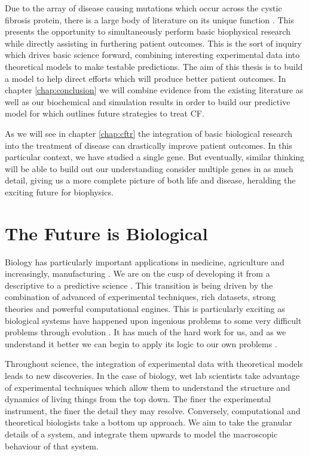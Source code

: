 Due to the array of disease causing mutations which occur across the cystic fibrosis protein, there is a large body of literature on its unique function \cite{csanady2019a}. This presents the opportunity to simultaneously perform basic biophysical research while directly assisting in furthering patient outcomes. This is the sort of inquiry which drives basic science forward, combining interesting experimental data into theoretical models to make testable predictions. The aim of this thesis is to build a model to help direct efforts which will produce better patient outcomes. In chapter \ref{chap:conclusion} we will combine evidence from the existing literature as well as our biochemical and simulation results in order to build our predictive model for which outlines future strategies to treat CF.

As we will see in chapter \ref{chap:cftr} the integration of basic biological research into the treatment of disease can drastically improve patient outcomes. In this particular context, we have studied a single gene. But eventually, similar thinking will be able to build out our understanding consider multiple genes in as much detail, giving us a more complete picture of both life and disease, heralding the exciting future for biophysics. 

\section{The Future is Biological}
Biology has particularly important applications in medicine, agriculture and increasingly, manufacturing \cite{anonymous2019, scown2022}. We are on the cusp of developing it from a descriptive to a predictive science \cite{kochanski1973,liu2005, mogilner2016, covert2021, jumper2021}. This transition is being driven by the combination of advanced of experimental techniques, rich datasets, strong theories and powerful computational engines. This is particularly exciting as biological systems have happened upon ingenious problems to some very difficult problems through evolution \cite{dawkins1989}. It has much of the hard work for us, and as we understand it better we can begin to apply its logic to our own problems \cite{benyus2009}.

Throughout science, the integration of experimental data with theoretical models leads to new discoveries. In the case of biology, wet lab scientists take advantage of experimental techniques which allow them to understand the structure and dynamics of living things from the top down. The finer the experimental instrument, the finer the detail they may resolve. Conversely, computational and theoretical biologists take a bottom up approach. We aim to take the granular details of a system, and integrate them upwards to model the macroscopic behaviour of that system. 


